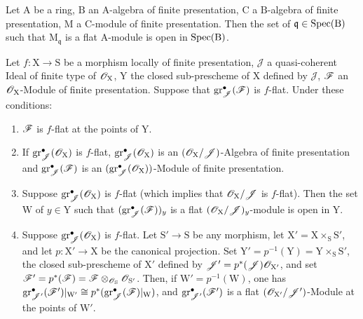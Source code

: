 \begin{corollary}[11.3.3]
\label{IV.11.3.3}
Let $\mathrm{A}$ be a ring, $\mathrm{B}$ an $\mathrm{A}$-algebra of finite presentation, $\mathrm{C}$ a $\mathrm{B}$-algebra of finite presentation, $\mathrm{M}$ a $\mathrm{C}$-module of finite presentation. Then the set of $\mathfrak{q}\in\operatorname{Spec}(\mathrm{B})$ such that $\mathrm{M}_\mathfrak{q}$ is a flat $\mathrm{A}$-module is open in $\operatorname{Spec}(\mathrm{B})$.
\end{corollary}

\begin{proposition}[11.3.4]
\label{IV.11.3.4}
Let $f:\mathrm{X}\to\mathrm{S}$ be a morphism locally of finite presentation, $\mathscr{J}$ a quasi-coherent Ideal of finite type of $\mathscr{O}_\mathrm{X}$, $\mathrm{Y}$ the closed sub-prescheme of $\mathrm{X}$ defined by $\mathscr{J}$, $\mathscr{F}$ an $\mathscr{O}_\mathrm{X}$-Module of finite presentation. Suppose that $\operatorname{gr}^\bullet_\mathscr{J}(\mathscr{F})$ is $f$-flat. Under these conditions:
\begin{enumerate}[label=\emph{(\roman*)}]
  \item $\mathscr{F}$ is $f$-flat at the points of $\mathrm{Y}$.
  \item If $\operatorname{gr}^\bullet_\mathscr{J}(\mathscr{O}_\mathrm{X})$ is $f$-flat, $\operatorname{gr}^\bullet_\mathscr{J}(\mathscr{O}_\mathrm{X})$ is an $(\mathscr{O}_\mathrm{X}/\mathscr{J})$-Algebra of finite presentation and $\operatorname{gr}^\bullet_\mathscr{J}(\mathscr{F})$ is an $(\operatorname{gr}^\bullet_\mathscr{J}(\mathscr{O}_\mathrm{X}))$-Module of finite presentation.
  \item Suppose $\operatorname{gr}^\bullet_\mathscr{J}(\mathscr{O}_\mathrm{X})$ is $f$-flat (which implies that $\mathscr{O}_\mathrm{X}/\mathscr{J}$ is $f$-flat). Then the set $\mathrm{W}$ of $y\in\mathrm{Y}$ such that $(\operatorname{gr}^\bullet_\mathscr{J}(\mathscr{F}))_y$ is a flat $(\mathscr{O}_\mathrm{X}/\mathscr{J})_y$-module is open in $\mathrm{Y}$.
  \item Suppose $\operatorname{gr}^\bullet_\mathscr{J}(\mathscr{O}_\mathrm{X})$ is $f$-flat. Let $\mathrm{S}'\to\mathrm{S}$ be any morphism, let $\mathrm{X}'=\mathrm{X}\times_\mathrm{S}\mathrm{S}'$, and let $p:\mathrm{X}'\to\mathrm{X}$ be the canonical projection. Set $\mathrm{Y}'=p^{-1}(\mathrm{Y})=\mathrm{Y}\times_\mathrm{S}\mathrm{S}'$, the closed sub-prescheme of $\mathrm{X}'$ defined by $\mathscr{J}'=p^*(\mathscr{J})\mathscr{O}_{\mathrm{X}'}$, and set $\mathscr{F}'=p^*(\mathscr{F})=\mathscr{F}\otimes_{\mathscr{O}_\mathrm{S}}\mathscr{O}_{\mathrm{S}'}$. Then, if $\mathrm{W}'=p^{-1}(\mathrm{W})$, one has $\operatorname{gr}^\bullet_{\mathscr{J}'}(\mathscr{F}')|_{\mathrm{W}'}\cong p^*(\operatorname{gr}^\bullet_\mathscr{J}(\mathscr{F})|_\mathrm{W})$, and $\operatorname{gr}^\bullet_{\mathscr{J}'}(\mathscr{F}')$ is a flat $(\mathscr{O}_{\mathrm{X}'}/\mathscr{J}')$-Module at the points of $\mathrm{W}'$.
\end{enumerate}
\end{proposition}

